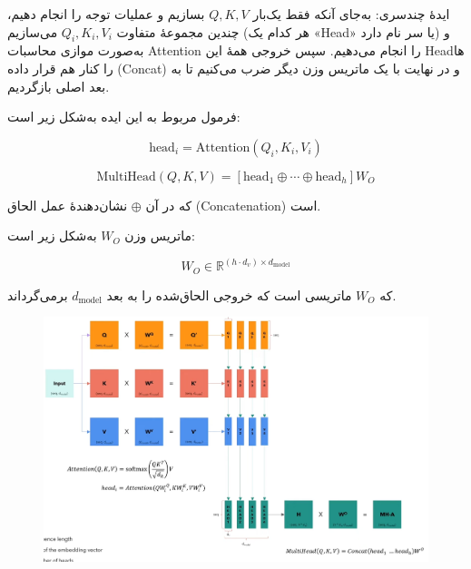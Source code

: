 ایدهٔ چندسری:  
به‌جای آنکه فقط یک‌بار \( Q, K, V \) بسازیم و عملیات توجه را انجام دهیم، چندین مجموعهٔ متفاوت \( Q_i, K_i, V_i \) می‌سازیم (هر کدام یک «Head» یا سر نام دارد) و به‌صورت موازی محاسبات Attention را انجام می‌دهیم. سپس خروجی همهٔ این Headها را کنار هم قرار داده (Concat) و در نهایت با یک ماتریس وزن دیگر ضرب می‌کنیم تا به بعد اصلی بازگردیم.

فرمول مربوط به این ایده به‌شکل زیر است:


\begin{equation}
	\text{head}_i = \text{Attention}(Q_i, K_i, V_i)
	\label{eq:head_i}
\end{equation}


\begin{equation}
	\text{MultiHead}(Q, K, V) = [\text{head}_1 \oplus \cdots \oplus \text{head}_h] W_O
	\label{eq:multihead}
\end{equation}

که در آن \( \oplus \) نشان‌دهندهٔ عمل الحاق (Concatenation) است.

ماتریس وزن \( W_O \) به‌شکل زیر است:

\[
W_O \in \mathbb{R}^{(h \cdot d_v) \times d_{\text{model}}}
\]

که \( W_O \) ماتریسی است که خروجی الحاق‌شده را به بعد \( d_{\text{model}} \) برمی‌گرداند.





\begin{figure}[h]
	\centering
	\begin{minipage}[b]{0.9\textwidth}
		\centering
		\includegraphics[width=\textwidth]{transformer_images/multi_head_attention.png}
		\caption{}
		\label{fig:attention}
	\end{minipage}
	\hfill
	
\end{figure}



